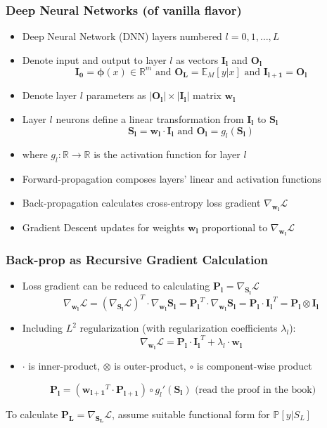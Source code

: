 \documentclass[handout]{beamer}
\begin{document}
\begin{frame}
\frametitle{Deep Neural Networks (of vanilla flavor)}
\pause
\begin{itemize}[<+->]
\item Deep Neural Network (DNN) layers numbered $l = 0, 1, \ldots, L$
\item Denote input and output to layer $l$ as vectors $\bm{I_l}$ and $\bm{O_l}$
$$\bm{I_0} = \bm{\phi}(x) \in \mathbb{R}^m \text{ and } \bm{O_L} = \mathbb{E}_M[y|x] \text{ and } \bm{I_{l+1}} = \bm{O_l}$$
\item Denote layer $l$ parameters as $|\bm{O_l}| \times |\bm{I_l}|$ matrix $\bm{w_l}$
\item Layer $l$ neurons define a linear transformation from $\bm{I_l}$ to $\bm{S_l}$
$$\bm{S_l} = \bm{w_l} \cdot \bm{I_l} \text{ and } \bm{O_l} = g_l(\bm{S_l})$$
\item where $g_l: \mathbb{R} \rightarrow \mathbb{R}$ is the activation function for layer $l$
\item Forward-propagation composes layers' linear and activation functions
\item Back-propagation calculates cross-entropy loss gradient $\nabla_{\bm{w_l}} \mathcal{L}$
\item Gradient Descent updates for weights $\bm{w_l}$ proportional to $\nabla_{\bm{w_l}} \mathcal{L}$
\end{itemize}
\end{frame}

\begin{frame}
\frametitle{Back-prop as Recursive Gradient Calculation}
\pause
\begin{itemize}[<+->]
\item Loss gradient can be reduced to calculating $\bm{P_l} = \nabla_{\bm{S_l}} \mathcal{L}$
$$\nabla_{\bm{w_l}} \mathcal{L} = (\nabla_{\bm{S_l}} \mathcal{L})^T \cdot \nabla_{\bm{w_l}} \bm{S_l} = \bm{P_l}^T \cdot \nabla_{\bm{w_l}} \bm{S_l} = \bm{P_l} \cdot \bm{I_l}^T = \bm{P_l} \otimes \bm{I_l}$$
\item Including $L^2$ regularization (with regularization coefficients $\lambda_l$):
$$\nabla_{\bm{w_l}} \mathcal{L} = \bm{P_l} \cdot \bm{I_l}^T + \lambda_l \cdot \bm{w_l} $$
\item $\cdot$ is inner-product, $\otimes$ is outer-product, $\circ$ is component-wise product
\end{itemize}
\pause
\begin{theorem}
$$\bm{P_l} = (\bm{w_{l+1}}^T \cdot \bm{P_{l+1}}) \circ g_l'(\bm{S_l}) \text{ (read the proof in the book)}$$
\end{theorem}
\pause
To calculate $\bm{P_L} = \nabla_{\bm{S_L}} \mathcal{L}$, assume suitable functional form for $\mathbb{P}[y|S_L]$
\end{frame}
\end{document}
